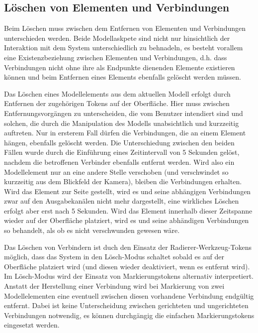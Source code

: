 \subsection{Löschen von Elementen und Verbindungen} %
\label{sub:löschen_von_elementen}

Beim Löschen muss zwischen dem Entfernen von Elementen und Verbindungen unterschieden werden. Beide Modellaskpete sind nicht nur hinsichtlich der Interaktion mit dem System unterschiedlich zu behnadeln, es besteht vorallem eine Existenzbeziehung zwischen Elementen und Verbindungen, d.h. dass Verbindungen nicht ohne ihre als Endpunkte dienenden Elemente existieren können und beim Entfernen eines Elements ebenfalls gelöscht werden müssen.

Das Löschen eines Modellelements aus dem aktuellen Modell erfolgt durch Entfernen der zugehörigen Tokens auf der Oberfläche. Hier muss zwischen Entfernungsvorgängen zu unterscheiden, die vom Benutzer intendiert sind und solchen, die durch die Manipulation des Modells unabsichtlich und kurzzeitig auftreten. Nur in ersterem Fall dürfen die Verbindungen, die an einem Element hängen, ebenfalls gelöscht werden. Die Unterschiedung zwischen den beiden Fällen wurde durch die Einführung eines Zeitintervall von 5 Sekunden gelöst, nachdem die betroffenen Verbinder ebenfalls entfernt werden. Wird also ein Modellelement nur an eine andere Stelle verschoben (und verschwindet so kurzzeitig aus dem Blickfeld der Kamera), bleiben die Verbindungen erhalten. Wird das Element zur Seite gestellt, wird es und seine abhängigen Verbindungen zwar auf den Ausgabekanälen nicht mehr dargestellt, eine wirkliches Löschen erfolgt aber erst nach 5 Sekunden. Wird das Element innerhalb dieser Zeitspanne wieder auf der Oberfläche platziert, wird es und seine abhändigen Verbindungen so behandelt, als ob es nicht verschwunden gewesen wäre.

Das Löschen von Verbindern ist duch den Einsatz der Radierer-Werkzeug-Tokens möglich, dass das System in den Lösch-Modus schaltet sobald es auf der Oberfläche platziert wird (und diesen wieder deaktiviert, wenn es entfernt wird). Im Lösch-Modus wird der Einsatz von Markierungstokens alternativ interpretiert. Anstatt der Herstellung einer Verbindung wird bei Markierung von zwei Modellelementen eine eventuell zwischen diesen vorhandene Verbindung endgültig entfernt. Dabei ist keine Unterscheidung zwischen gerichteten und ungerichteten Verbindungen notwendig, es können durchgängig die einfachen Markierungstokens eingesetzt werden.

